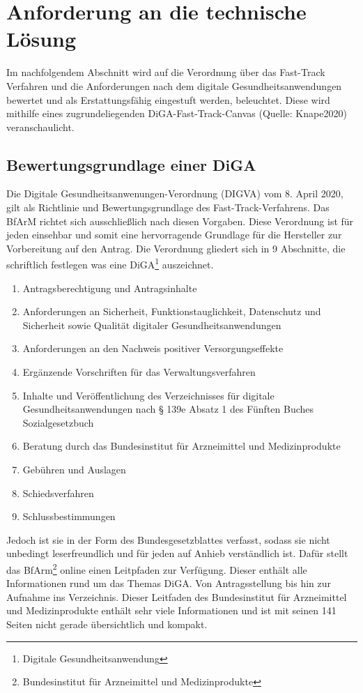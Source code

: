 \section{Anforderung an die technische Lösung}
Im nachfolgendem Abschnitt wird auf die Verordnung über das Fast-Track Verfahren und die Anforderungen nach dem digitale Gesundheitsanwendungen bewertet und als Erstattungsfähig eingestuft werden, beleuchtet. Diese wird mithilfe eines zugrundeliegenden DiGA-Fast-Track-Canvas
(Quelle: Knape2020) veranschaulicht.
\subsection{ Bewertungsgrundlage einer DiGA }
Die Digitale Gesundheitsanwenungen-Verordnung (DIGVA) vom 8. April 2020, gilt als Richtlinie und Bewertungsgrundlage des Fast-Track-Verfahrens. Das BfArM richtet sich ausschließlich nach diesen Vorgaben. Diese Verordnung ist für jeden einsehbar und somit eine hervorragende Grundlage für die Hersteller zur Vorbereitung auf den Antrag.
Die Verordnung gliedert sich in 9 Abschnitte, die schriftlich festlegen was eine DiGA\footnote{Digitale Gesundheitsanwendung} auszeichnet.
\begin{enumerate}
	\item \small{Antragsberechtigung und Antragsinhalte}
	\item \small{Anforderungen an Sicherheit, Funktionstauglichkeit, Datenschutz und Sicherheit sowie Qualität digitaler Gesundheitsanwendungen}
	\item \small{Anforderungen an den Nachweis positiver Versorgungseffekte}
	\item \small{Ergänzende Vorschriften für das Verwaltungsverfahren}
	\item \small{Inhalte und Veröffentlichung des Verzeichnisses für digitale Gesundheitsanwendungen nach § 139e Absatz 1 des Fünften Buches Sozialgesetzbuch}
	\item \small{Beratung durch das Bundesinstitut für Arzneimittel und Medizinprodukte}
	\item \small{Gebühren und Auslagen}
	\item \small{Schiedsverfahren}
	\item \small{Schlussbestimmungen}
\end{enumerate}

Jedoch ist sie in der Form des Bundesgesetzblattes verfasst, sodass sie nicht unbedingt leserfreundlich und für jeden auf Anhieb verständlich ist. Dafür stellt das BfArm\footnote{Bundesinstitut für Arzneimittel und Medizinprodukte\label{ftn:bfarm}} online einen Leitpfaden zur Verfügung. Dieser enthält alle Informationen rund um das Themas DiGA. Von Antragsstellung bis hin zur Aufnahme ins Verzeichnis. Dieser Leitfaden des Bundesinstitut für Arzneimittel und Medizinprodukte enthält sehr viele Informationen und ist mit seinen 141 Seiten nicht gerade übersichtlich und kompakt.

